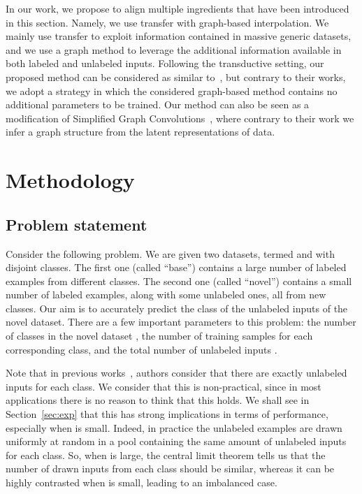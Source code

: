 \documentclass[a4paper,conference]{IEEEtran}
\begin{document}
In our work, we propose to align multiple ingredients that have been introduced in this section. Namely, we use transfer with graph-based interpolation. We mainly use transfer to exploit information contained in massive generic datasets, and we use a graph method to leverage the additional information available in both labeled and unlabeled inputs. Following the transductive setting, our proposed method can be considered as similar to~\cite{liu2018learning,garcia2017few,kim2019edge,gidaris2019generating}, but contrary to their works, we adopt a strategy in which the considered graph-based method contains no additional parameters to be trained. Our method can also be seen as a modification of Simplified Graph Convolutions~\cite{wu2019simplifying}, where contrary to their work we infer a graph structure from the latent representations of data.

\section{Methodology}
\label{sec:met}

\subsection{Problem statement}
Consider the following problem. We are given two datasets, termed  and  with disjoint classes. The first one (called ``base'') contains a large number of labeled examples from  different classes. The second one (called ``novel'') contains a small number of labeled examples, along with some unlabeled ones, all from  new classes. Our aim is to accurately predict the class of the unlabeled inputs of the novel dataset. There are a few important parameters to this problem: the number of classes in the novel dataset , the number of training samples  for each corresponding class, and the total number of unlabeled inputs .

Note that in previous works~\cite{liu2018learning}, authors consider that there are exactly  unlabeled inputs for each class. We consider that this is non-practical, since in most applications there is no reason to think that this holds. We shall see in Section~\ref{sec:exp} that this has strong implications in terms of performance, especially when  is small. Indeed, in practice the  unlabeled examples are drawn uniformly at random in a pool containing the same amount of unlabeled inputs for each class. So, when  is large, the central limit theorem tells us that the number of drawn inputs from each class should be similar, whereas it can be highly contrasted when  is small, leading to an imbalanced case.
\end{document}
